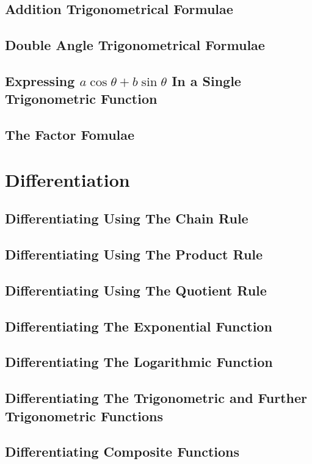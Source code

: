 \documentclass{article}
\begin{document}
	\subsection{Addition Trigonometrical Formulae}
	\subsection{Double Angle Trigonometrical Formulae}
	\subsection{Expressing $a\cos\theta + b\sin\theta$ In a Single Trigonometric Function}
	\subsection{The Factor Fomulae}
	\section{Differentiation}
	\subsection{Differentiating Using The Chain Rule}
	\subsection{Differentiating Using The Product Rule}
	\subsection{Differentiating Using The Quotient Rule}
	\subsection{Differentiating The Exponential Function}
	\subsection{Differentiating The Logarithmic Function}
	\subsection{Differentiating The Trigonometric and Further Trigonometric Functions}
	\subsection{Differentiating Composite Functions}
\end{document}
